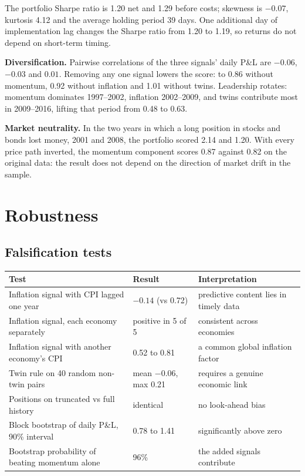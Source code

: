 \documentclass[10.5pt,a4paper]{article}
\begin{document}
The portfolio Sharpe ratio is 1.20 net and 1.29 before costs; skewness is $-0.07$, kurtosis 4.12 and the average holding period 39 days. One additional day of implementation lag changes the Sharpe ratio from 1.20 to 1.19, so returns do not depend on short-term timing.

\textbf{Diversification.} Pairwise correlations of the three signals' daily P\&L are $-0.06$, $-0.03$ and $0.01$. Removing any one signal lowers the score: to 0.86 without momentum, 0.92 without inflation and 1.01 without twins. Leadership rotates: momentum dominates 1997--2002, inflation 2002--2009, and twins contribute most in 2009--2016, lifting that period from 0.48 to 0.63.

\textbf{Market neutrality.} In the two years in which a long position in stocks and bonds lost money, 2001 and 2008, the portfolio scored 2.14 and 1.20. With every price path inverted, the momentum component scores 0.87 against 0.82 on the original data: the result does not depend on the direction of market drift in the sample.

\section{Robustness}
\subsection{Falsification tests}
\begin{table}[h]
\centering\small
\begin{tabular}{p{7.0cm}p{3.4cm}p{4.9cm}}
\toprule
Test & Result & Interpretation \\
\midrule
Inflation signal with CPI lagged one year & $-0.14$ (vs 0.72) & predictive content lies in timely data \\
Inflation signal, each economy separately & positive in 5 of 5 & consistent across economies \\
Inflation signal with another economy's CPI & 0.52 to 0.81 & a common global inflation factor \\
Twin rule on 40 random non-twin pairs & mean $-0.06$, max 0.21 & requires a genuine economic link \\
Positions on truncated vs full history & identical & no look-ahead bias \\
Block bootstrap of daily P\&L, 90\% interval & 0.78 to 1.41 & significantly above zero \\
Bootstrap probability of beating momentum alone & 96\% & the added signals contribute \\
\bottomrule
\end{tabular}
\end{table}
\end{document}
